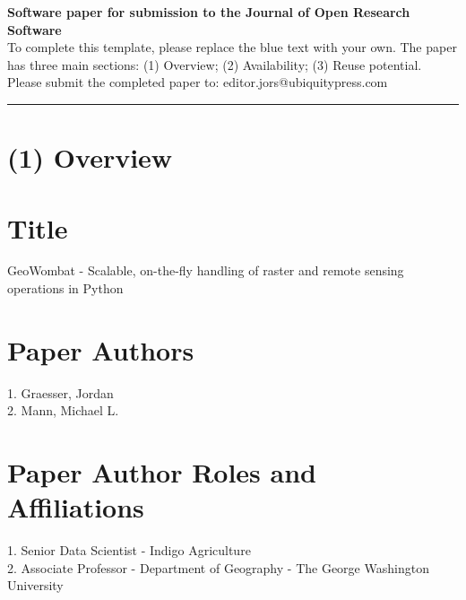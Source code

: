 \documentclass{jors}
\begin{document}
{\bf Software paper for submission to the Journal of Open Research Software} \\

To complete this template, please replace the blue text with your own. The paper has three main sections: (1) Overview; (2) Availability; (3) Reuse potential. \\

Please submit the completed paper to: editor.jors@ubiquitypress.com

\rule{\textwidth}{1pt}

\section*{(1) Overview}

\vspace{0.5cm}

\section*{Title}


GeoWombat - Scalable, on-the-fly handling of raster and remote sensing operations in Python

\section*{Paper Authors}

1. Graesser, Jordan  \\
2. Mann, Michael L. 


\section*{Paper Author Roles and Affiliations}
1. Senior Data Scientist - Indigo Agriculture\\
2. Associate Professor - Department of Geography - The George Washington University
\end{document}

